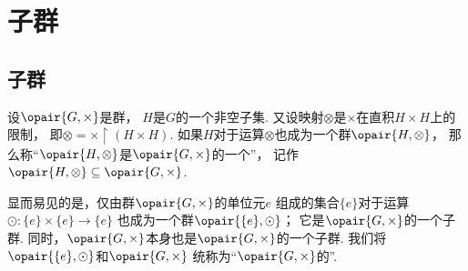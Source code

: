 \section{子群}
\subsection{子群}
\begin{definition}
设\(\opair{G,\times}\)是群，
\(H\)是\(G\)的一个非空子集.
又设映射\(\otimes\)是\(\times\)在直积\(H \times H\)上的限制，
即\(\otimes = \times \upharpoonright(H \times H)\).
如果\(H\)对于运算\(\otimes\)也成为一个群\(\opair{H,\otimes}\)，
那么称“\(\opair{H,\otimes}\)是\(\opair{G,\times}\)的一个”，
记作\(\opair{H,\otimes} \subseteq \opair{G,\times}\).
\end{definition}

显而易见的是，仅由群\(\opair{G,\times}\)的单位元\(e\)%
组成的集合\(\{e\}\)对于运算\(\odot\colon \{e\}\times\{e\}\to\{e\}\)%
也成为一个群\(\opair{\{e\},\odot}\)；
它是\(\opair{G,\times}\)的一个子群.
同时，\(\opair{G,\times}\)本身也是\(\opair{G,\times}\)的一个子群.
我们将\(\opair{\{e\},\odot}\)和\(\opair{G,\times}\)%
统称为“\(\opair{G,\times}\)的”.

